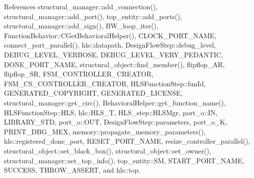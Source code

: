 References structural\+\_\+manager\+::add\+\_\+connection(), structural\+\_\+manager\+::add\+\_\+port(), top\+\_\+entity\+::add\+\_\+ports(), structural\+\_\+manager\+::add\+\_\+sign(), B\+W\+\_\+loop\+\_\+iter(), Function\+Behavior\+::\+C\+Get\+Behavioral\+Helper(), C\+L\+O\+C\+K\+\_\+\+P\+O\+R\+T\+\_\+\+N\+A\+ME, connect\+\_\+port\+\_\+parallel(), hls\+::datapath, Design\+Flow\+Step\+::debug\+\_\+level, D\+E\+B\+U\+G\+\_\+\+L\+E\+V\+E\+L\+\_\+\+V\+E\+R\+B\+O\+SE, D\+E\+B\+U\+G\+\_\+\+L\+E\+V\+E\+L\+\_\+\+V\+E\+R\+Y\+\_\+\+P\+E\+D\+A\+N\+T\+IC, D\+O\+N\+E\+\_\+\+P\+O\+R\+T\+\_\+\+N\+A\+ME, structural\+\_\+object\+::find\+\_\+member(), flipflop\+\_\+\+AR, flipflop\+\_\+\+SR, F\+S\+M\+\_\+\+C\+O\+N\+T\+R\+O\+L\+L\+E\+R\+\_\+\+C\+R\+E\+A\+T\+OR, F\+S\+M\+\_\+\+C\+S\+\_\+\+C\+O\+N\+T\+R\+O\+L\+L\+E\+R\+\_\+\+C\+R\+E\+A\+T\+OR, H\+L\+S\+Function\+Step\+::fun\+Id, G\+E\+N\+E\+R\+A\+T\+E\+D\+\_\+\+C\+O\+P\+Y\+R\+I\+G\+HT, G\+E\+N\+E\+R\+A\+T\+E\+D\+\_\+\+L\+I\+C\+E\+N\+SE, structural\+\_\+manager\+::get\+\_\+circ(), Behavioral\+Helper\+::get\+\_\+function\+\_\+name(), H\+L\+S\+Function\+Step\+::\+H\+LS, hls\+::\+H\+L\+S\+\_\+T, H\+L\+S\+\_\+step\+::\+H\+L\+S\+Mgr, port\+\_\+o\+::\+IN, L\+I\+B\+R\+A\+R\+Y\+\_\+\+S\+TD, port\+\_\+o\+::\+O\+UT, Design\+Flow\+Step\+::parameters, port\+\_\+o\+\_\+K, P\+R\+I\+N\+T\+\_\+\+D\+B\+G\+\_\+\+M\+EX, memory\+::propagate\+\_\+memory\+\_\+parameters(), hls\+::registered\+\_\+done\+\_\+port, R\+E\+S\+E\+T\+\_\+\+P\+O\+R\+T\+\_\+\+N\+A\+ME, resize\+\_\+controller\+\_\+parallel(), structural\+\_\+object\+::set\+\_\+black\+\_\+box(), structural\+\_\+object\+::set\+\_\+owner(), structural\+\_\+manager\+::set\+\_\+top\+\_\+info(), top\+\_\+entity\+::\+SM, S\+T\+A\+R\+T\+\_\+\+P\+O\+R\+T\+\_\+\+N\+A\+ME, S\+U\+C\+C\+E\+SS, T\+H\+R\+O\+W\+\_\+\+A\+S\+S\+E\+RT, and hls\+::top.

